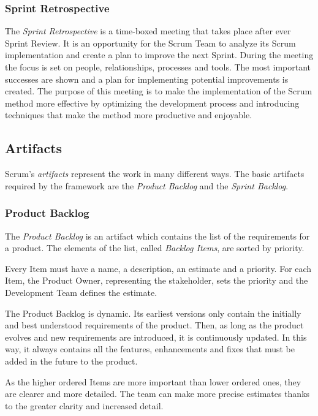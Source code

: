 			\subsubsection{Sprint Retrospective}\label{ref_scrum_sprint_retro}
			The \emph{Sprint Retrospective} is a time-boxed meeting that takes place after ever Sprint Review. It is an opportunity for the Scrum Team to analyze its Scrum implementation and create a plan to improve the next Sprint. 
			During the meeting the focus is set on people, relationships, processes and tools. The most important successes are shown and a plan for implementing potential improvements is created. 
			The purpose of this meeting is to make the implementation of the Scrum method more effective by optimizing the development process and introducing techniques that make the method more productive and enjoyable. 

		
		\subsection{Artifacts}\label{ref_scrum_artifacts}
			Scrum's \emph{artifacts} represent the work in many different ways. The basic artifacts required by the framework are the \emph{Product Backlog} and the \emph{Sprint Backlog}.

			\subsubsection{Product Backlog}\label{ref_scrum_prod_backlog}
			The \emph{Product Backlog} is an artifact which contains the list of the requirements for a product. The elements of the list, called \emph{Backlog Items}, are sorted by priority.

			Every Item must have a name, a description, an estimate and a priority. For each Item, the Product Owner, representing the stakeholder, sets the priority and the Development Team defines the estimate.

			The Product Backlog is dynamic. Its earliest versions only contain the initially and best understood requirements of the product. Then, as long as the product evolves and new requirements are introduced, it is continuously updated. In this way, it always contains all the features, enhancements and fixes that must be added in the future to the product.  

			As the higher ordered Items are more important than lower ordered ones, they are clearer and more detailed. The team can make more precise estimates thanks to the greater clarity and increased detail. 
			
